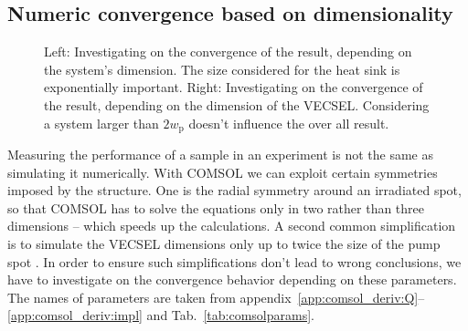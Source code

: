 \subsection{Numeric convergence based on dimensionality}
\label{app:numconv}

\begin{figure}
\centering
{}
\caption{Left: Investigating on the convergence of the result,
depending on the system's dimension.
The size considered for the heat sink
is exponentially important.
Right: Investigating on the convergence of the result,
depending on the dimension of the VECSEL.
Considering a system larger than $2w_\mathrm{p}$
doesn't influence the over all result.}
\label{img:r_HS-r_v-vs-dT}
\end{figure}

Measuring the performance of a sample
in an experiment
is not the same as simulating it
numerically.
With COMSOL we can exploit
certain symmetries
imposed by the structure.
One is the radial symmetry
around an irradiated spot,
so that COMSOL has to solve
the equations only in two
rather than three dimensions --
which speeds up the calculations.
A second common simplification
is to simulate the VECSEL dimensions
only up to twice the size
of the pump spot \cite{Kemp2008}.
In order to ensure
such simplifications
don't lead to wrong conclusions,
we have to investigate
on the convergence behavior
depending on these parameters.
The names of parameters
are taken from
appendix~\ref{app:comsol_deriv:Q}--\ref{app:comsol_deriv:impl}
and Tab.~\ref{tab:comsolparams}.

